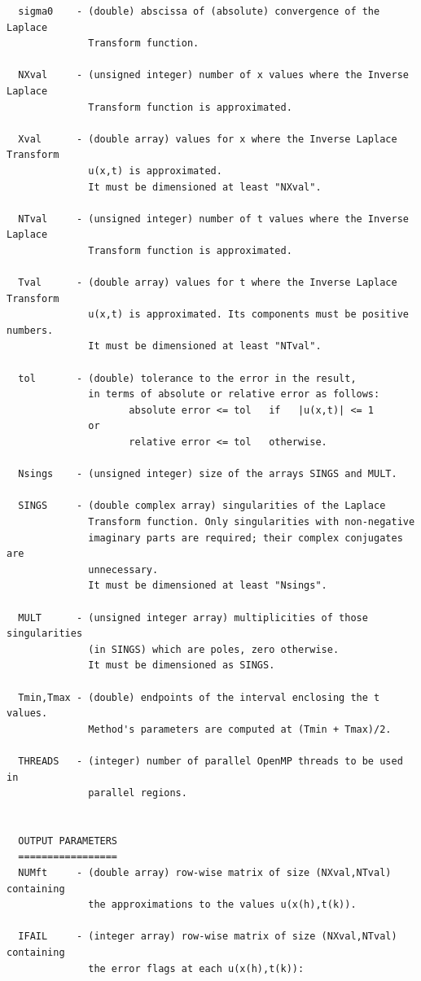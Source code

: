 \documentclass[a4paper,10pt]{report}%
\begin{document}
\begin{lstlisting}
  sigma0    - (double) abscissa of (absolute) convergence of the Laplace
              Transform function.

  NXval     - (unsigned integer) number of x values where the Inverse Laplace
              Transform function is approximated.

  Xval      - (double array) values for x where the Inverse Laplace Transform
              u(x,t) is approximated.
              It must be dimensioned at least "NXval".

  NTval     - (unsigned integer) number of t values where the Inverse Laplace
              Transform function is approximated.

  Tval      - (double array) values for t where the Inverse Laplace Transform
              u(x,t) is approximated. Its components must be positive numbers.
              It must be dimensioned at least "NTval".

  tol       - (double) tolerance to the error in the result,
              in terms of absolute or relative error as follows:
                     absolute error <= tol   if   |u(x,t)| <= 1
              or
                     relative error <= tol   otherwise.

  Nsings    - (unsigned integer) size of the arrays SINGS and MULT.

  SINGS     - (double complex array) singularities of the Laplace
              Transform function. Only singularities with non-negative
              imaginary parts are required; their complex conjugates are
              unnecessary.
              It must be dimensioned at least "Nsings".

  MULT      - (unsigned integer array) multiplicities of those singularities
              (in SINGS) which are poles, zero otherwise.
              It must be dimensioned as SINGS.

  Tmin,Tmax - (double) endpoints of the interval enclosing the t values.
              Method's parameters are computed at (Tmin + Tmax)/2.

  THREADS   - (integer) number of parallel OpenMP threads to be used in
              parallel regions.


  OUTPUT PARAMETERS
  =================
  NUMft     - (double array) row-wise matrix of size (NXval,NTval) containing
              the approximations to the values u(x(h),t(k)).

  IFAIL     - (integer array) row-wise matrix of size (NXval,NTval) containing
              the error flags at each u(x(h),t(k)):


\end{lstlisting}
\end{document}
